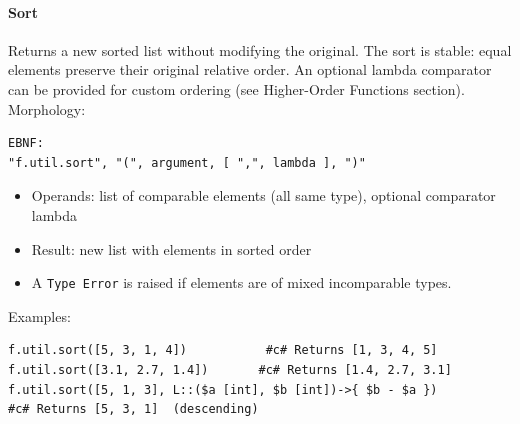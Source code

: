 \paragraph{Sort}
Returns a new sorted list without modifying the original. The sort is stable: equal elements preserve their original relative order. An optional lambda comparator can be provided for custom ordering (see Higher-Order Functions section).\\
Morphology:
\begin{verbatim}
EBNF:
"f.util.sort", "(", argument, [ ",", lambda ], ")"
\end{verbatim}
\begin{itemize}
\item Operands: list of comparable elements (all same type), optional comparator lambda
\item Result: new list with elements in sorted order
\item A \texttt{Type Error} is raised if elements are of mixed incomparable types.
\end{itemize}
Examples:
\begin{verbatim}
f.util.sort([5, 3, 1, 4])           #c# Returns [1, 3, 4, 5]
f.util.sort([3.1, 2.7, 1.4])       #c# Returns [1.4, 2.7, 3.1]
f.util.sort([5, 1, 3], L::($a [int], $b [int])->{ $b - $a })
#c# Returns [5, 3, 1]  (descending)
\end{verbatim}

